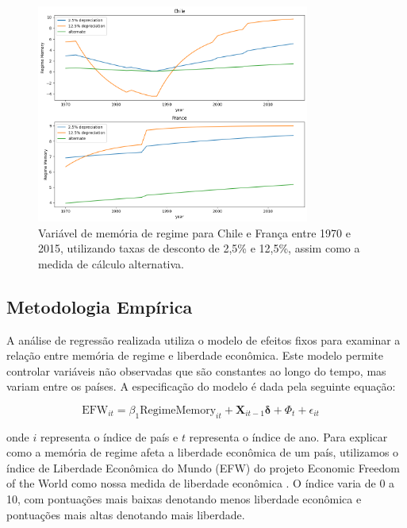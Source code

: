 \begin{figure}[h!]
    \centering
    \caption{Variável de memória de regime para Chile e França entre 1970 e 2015, utilizando taxas de desconto de 2,5\% e 12,5\%, assim como a medida de cálculo alternativa.}
    \includegraphics[width=0.8\textwidth]{Textuais/chile.png}
\end{figure}

\subsection{Metodologia Empírica}

A análise de regressão realizada utiliza o modelo de efeitos fixos para examinar a relação entre memória de regime e liberdade econômica. Este modelo permite controlar variáveis não observadas que são constantes ao longo do tempo, mas variam entre os países. A especificação do modelo é dada pela seguinte equação:

\begin{equation}
    \text{EFW}_{it} = \beta_1 \text{RegimeMemory}_{it} + \mathbf{X}_{it-1} \boldsymbol{\delta} + \Phi_t + \epsilon_{it} \quad 
\end{equation}

onde $i$ representa o índice de país e $t$ representa o índice de ano. Para explicar como a memória de regime afeta a liberdade econômica de um país, utilizamos o índice de Liberdade Econômica do Mundo (EFW) do projeto Economic Freedom of the World como nossa medida de liberdade econômica \cite{gwartney2022}. O índice varia de 0 a 10, com pontuações mais baixas denotando menos liberdade econômica e pontuações mais altas denotando mais liberdade.



